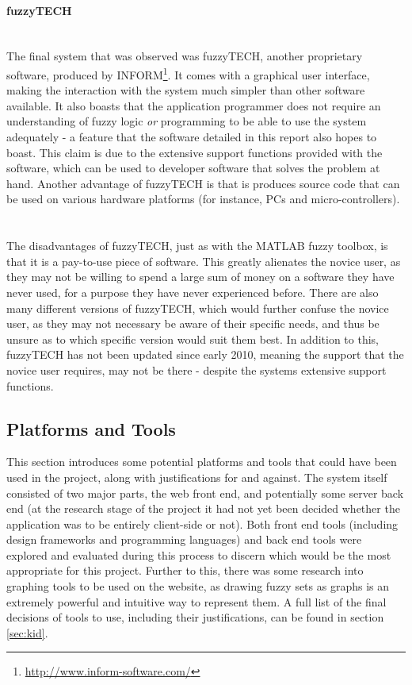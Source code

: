 \paragraph{fuzzyTECH}\ \\
The final system that was observed was fuzzyTECH, another proprietary software, produced by INFORM\footnote{\url{http://www.inform-software.com/}}. It comes with a graphical user interface, making the interaction with the system much simpler than other software available. It also boasts that the application programmer does not require an understanding of fuzzy logic \textit{or} programming to be able to use the system adequately - a feature that the software detailed in this report also hopes to boast. This claim is due to the extensive support functions provided with the software, which can be used to developer software that solves the problem at hand. Another advantage of fuzzyTECH is that is produces source code that can be used on various hardware platforms (for instance, PCs and micro-controllers).
\ \\
\ \\
The disadvantages of fuzzyTECH, just as with the MATLAB fuzzy toolbox, is that it is a pay-to-use piece of software. This greatly alienates the novice user, as they may not be willing to spend a large sum of money on a software they have never used, for a purpose they have never experienced before. There are also many different versions of fuzzyTECH, which would further confuse the novice user, as they may not necessary be aware of their specific needs, and thus be unsure as to which specific version would suit them best. In addition to this, fuzzyTECH has not been updated since early 2010, meaning the support that the novice user requires, may not be there - despite the systems extensive support functions. 




\subsection{Platforms and Tools}
This section introduces some potential platforms and tools that could have been used in the project, along with justifications for and against. The system itself consisted of two major parts, the web front end, and potentially some server back end (at the research stage of the project it had not yet been decided whether the application was to be entirely client-side or not). Both front end tools (including design frameworks and programming languages) and back end tools were explored and evaluated during this process to discern which would be the most appropriate for this project. Further to this, there was some research into graphing tools to be used on the website, as drawing fuzzy sets as graphs is an extremely powerful and intuitive way to represent them. A full list of the final decisions of tools to use, including their justifications, can be found in section \ref{sec:kid}.

